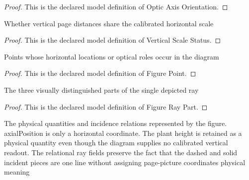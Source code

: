 \begin{proof}
  This is the declared model definition of Optic Axis Orientation.
\end{proof}
\begin{definition}
  \label{def:physics:phyx-mini-0109:phyxminiproblems-problemphyxmini0109-verticalscalestatus}
  Whether vertical page distances share the calibrated horizontal scale
\end{definition}
\begin{proof}
  This is the declared model definition of Vertical Scale Status.
\end{proof}
\begin{definition}
  \label{def:physics:phyx-mini-0109:phyxminiproblems-problemphyxmini0109-figurepoint}
  Points whose horizontal locations or optical roles occur in the diagram
\end{definition}
\begin{proof}
  This is the declared model definition of Figure Point.
\end{proof}
\begin{definition}
  \label{def:physics:phyx-mini-0109:phyxminiproblems-problemphyxmini0109-figureraypart}
  The three visually distinguished parts of the single depicted ray
\end{definition}
\begin{proof}
  This is the declared model definition of Figure Ray Part.
\end{proof}
\begin{definition}
  \label{def:physics:phyx-mini-0109:phyxminiproblems-problemphyxmini0109-principalraylensdiagram}
  The physical quantities and incidence relations represented by the figure. axialPosition is only a horizontal coordinate. The plant height is retained as a physical quantity even though the diagram supplies no calibrated vertical readout. The relational ray fields preserve the fact that the dashed and solid incident pieces are one line without assigning page-picture coordinates physical meaning
\end{definition}

